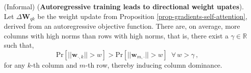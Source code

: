 \begin{theorem}
\label{theo-informal-directionality}
%
(Informal)
%
(\textbf{Autoregressive training leads to directional weight upates}).
%
%
Let $\Delta \bm{W}_{qk}$ be the weight update from Proposition \ref{prop-gradients-self-attention}, derived from an autoregressive objective function.
%
There are, on average, more columns with high norms than rows with high norms, that is, there exist a $\gamma \in \mathbb{R}$ such that,
%
\begin{equation}
    \text{Pr}[||\bm{w}_{\cdot, k}|| > w] > \text{Pr}[|| \bm{w}_{m, \cdot}|| > w] \,\,\ \forall \,w > \gamma \,,
\end{equation}
%
for any $k$-th column and $m$-th row,
%
thereby inducing column dominance.
%
\end{theorem}